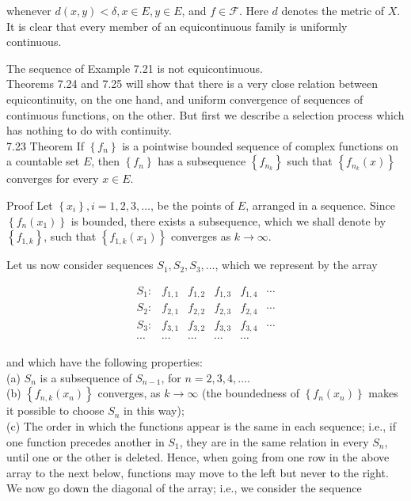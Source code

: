 \documentclass[10pt]{article}
\begin{document}
whenever $d(x, y)<\delta, x \in E, y \in E$, and $f \in \mathscr{F}$. Here $d$ denotes the metric of $X$.\\
It is clear that every member of an equicontinuous family is uniformly continuous.

The sequence of Example 7.21 is not equicontinuous.\\
Theorems 7.24 and 7.25 will show that there is a very close relation between equicontinuity, on the one hand, and uniform convergence of sequences of continuous functions, on the other. But first we describe a selection process which has nothing to do with continuity.\\
7.23 Theorem If $\left\{f_{n}\right\}$ is a pointwise bounded sequence of complex functions on a countable set $E$, then $\left\{f_{n}\right\}$ has a subsequence $\left\{f_{n_{k}}\right\}$ such that $\left\{f_{n_{k}}(x)\right\}$ converges for every $x \in E$.

Proof Let $\left\{x_{i}\right\}, i=1,2,3, \ldots$, be the points of $E$, arranged in a sequence. Since $\left\{f_{n}\left(x_{1}\right)\right\}$ is bounded, there exists a subsequence, which we shall denote by $\left\{f_{1, k}\right\}$, such that $\left\{f_{1, k}\left(x_{1}\right)\right\}$ converges as $k \rightarrow \infty$.

Let us now consider sequences $S_{1}, S_{2}, S_{3}, \ldots$, which we represent by the array

$$
\begin{array}{cccccc}
S_{1}: & f_{1,1} & f_{1,2} & f_{1,3} & f_{1,4} & \cdots \\
S_{2}: & f_{2,1} & f_{2,2} & f_{2,3} & f_{2,4} & \cdots \\
S_{3}: & f_{3,1} & f_{3,2} & f_{3,3} & f_{3,4} & \cdots \\
\cdots & \cdots & \cdots & \cdots & \cdots
\end{array}
$$

and which have the following properties:\\
(a) $S_{n}$ is a subsequence of $S_{n-1}$, for $n=2,3,4, \ldots$.\\
(b) $\left\{f_{n, k}\left(x_{n}\right)\right\}$ converges, as $k \rightarrow \infty$ (the boundedness of $\left\{f_{n}\left(x_{n}\right)\right\}$ makes it possible to choose $S_{n}$ in this way);\\
(c) The order in which the functions appear is the same in each sequence; i.e., if one function precedes another in $S_{1}$, they are in the same relation in every $S_{n}$, until one or the other is deleted. Hence, when going from one row in the above array to the next below, functions may move to the left but never to the right.\\
We now go down the diagonal of the array; i.e., we consider the sequence
\end{document}
